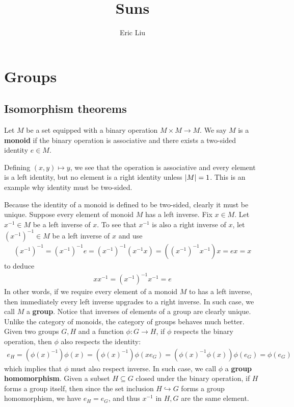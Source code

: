 \documentclass{report}
\title{Suns}
\author{Eric Liu}
\date{}
\begin{document}
\maketitle
\newpage %

\tableofcontents
\pagebreak
\chapter{Groups}

\section{Isomorphism theorems}
Let $M$ be a set equipped with a binary operation $M\times M \rightarrow M$. We say $M$ is a \textbf{monoid} if the binary operation is associative and there exists a two-sided identity $e \in M$. 
\begin{example}
Defining $(x,y)\mapsto y$, we see that the operation is associative and every element is a left identity, but no element is a right identity unless $\left|M\right|=1$. This is an example why identity must be two-sided. 
\end{example}
Because the identity of a monoid is defined to be two-sided, clearly it must be unique.  Suppose every element of monoid $M$ has a left inverse. Fix $x \in M$. Let $x^{-1}\in M$ be a left inverse of $x$. To see that  $x^{-1}$ is also a right inverse of $x$, let  $(x^{-1})^{-1}\in M$ be a left inverse of $x$ and use  
\begin{align*}
  (x^{-1})^{-1}=(x^{-1})^{-1}e=(x^{-1})^{-1}(x^{-1}x)= ((x^{-1})^{-1}x^{-1})x= ex=x
\end{align*}
to deduce
\begin{align*}
xx^{-1}=(x^{-1})^{-1}x^{-1}= e
\end{align*}
In other words, if we require every element of a monoid $M$ to has a left inverse, then immediately every left inverse upgrades to a right inverse. In such case, we call $M$ a  \textbf{group}. Notice that inverses of elements of a group are clearly unique. \\


Unlike the category of monoids, the category of groups behaves much better. Given two groups $G,H$ and a function  $\phi : G\rightarrow H$, if $\phi$ respects the binary operation, then $\phi$ also respects the identity:
\begin{align*}
e_H = (\phi (x)^{-1})\phi (x) = (\phi(x)^{-1}) \phi(x e_G) =  (\phi (x)^{-1} \phi (x)) \phi (e_G)=\phi (e_G)
\end{align*}
which implies that $\phi$ must also respect inverse. In such case, we call $\phi$ a \textbf{group homomorphism}. Given a subset $H \subseteq G$ closed under the binary operation, if $H$ forms a group itself, then since the set inclusion $H \hookrightarrow G$ forms a group homomorphism, we have $e_H=e_G$, and thus $x^{-1}$ in $H,G$ are the same element. \\
 
\end{document}
